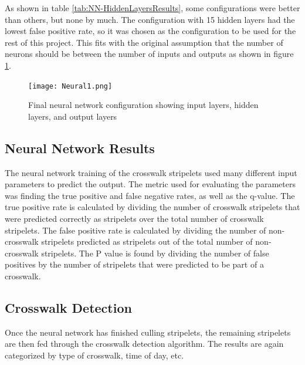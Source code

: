 \documentclass[12pt]{ucthesis}
\newcommand{\captionfonts}{\small\bf\ssp}
\begin{document}
As shown in table \ref{tab:NN-HiddenLayersResults}, some configurations were better than others, but none by much. The configuration with 15 hidden layers had the lowest false positive rate, so it was chosen as the configuration to be used for the rest of this project. This fits with the original assumption that the number of neurons should be between the number of inputs and outputs as shown in figure \ref{fig:Neural1png}. 

\begin{figure}[H]
\begin{center}
\texttt{[image: Neural1.png]}
\captionfonts
\caption[Final Neural Network Configuration]{Final neural network configuration showing input layers, hidden layers, and output layers}
\label{fig:Neural1png}
\end{center}
\end{figure}

\subsection{Neural Network Results}

The neural network training of the crosswalk stripelets used many different input parameters to predict the output. The metric used for evaluating the parameters was finding the true positive and false negative rates, as well as the q-value. The true positive rate is calculated by dividing the number of crosswalk stripelets that were predicted correctly as stripelets over the total number of crosswalk stripelets. The false positive rate is calculated by dividing the number of non-crosswalk stripelets predicted as stripelets out of the total number of non-crosswalk stripelets. The P value is found by dividing the number of false positives by the number of stripelets that were predicted to be part of a crosswalk.  


\subsection{Crosswalk Detection}
Once the neural network has finished culling stripelets, the remaining stripelets are then fed through the crosswalk detection algorithm. The results are again categorized by type of crosswalk, time of day, etc. 
\end{document}
